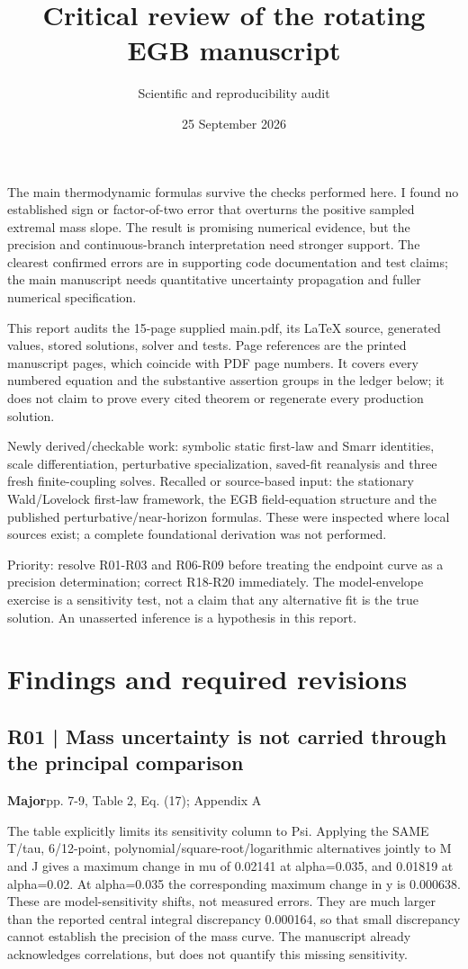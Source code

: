 \documentclass[10pt,a4paper]{article}
\title{Critical review of the rotating EGB manuscript}\author{Scientific and reproducibility audit}\date{25 September 2026}
\begin{document}
\maketitle

The main thermodynamic formulas survive the checks performed here. I found no established sign or factor-of-two error that overturns the positive sampled extremal mass slope. The result is promising numerical evidence, but the precision and continuous-branch interpretation need stronger support. The clearest confirmed errors are in supporting code documentation and test claims; the main manuscript needs quantitative uncertainty propagation and fuller numerical specification.


This report audits the 15-page supplied main.pdf, its LaTeX source, generated values, stored solutions, solver and tests. Page references are the printed manuscript pages, which coincide with PDF page numbers. It covers every numbered equation and the substantive assertion groups in the ledger below; it does not claim to prove every cited theorem or regenerate every production solution.


Newly derived/checkable work: symbolic static first-law and Smarr identities, scale differentiation, perturbative specialization, saved-fit reanalysis and three fresh finite-coupling solves. Recalled or source-based input: the stationary Wald/Lovelock first-law framework, the EGB field-equation structure and the published perturbative/near-horizon formulas. These were inspected where local sources exist; a complete foundational derivation was not performed.


Priority: resolve R01-R03 and R06-R09 before treating the endpoint curve as a precision determination; correct R18-R20 immediately. The model-envelope exercise is a sensitivity test, not a claim that any alternative fit is the true solution. An unasserted inference is a hypothesis in this report.


\section{Findings and required revisions}
\subsection*{R01 | Mass uncertainty is not carried through the principal comparison}
\textbf{Major}\quad pp. 7-9, Table 2, Eq. (17); Appendix A

The table explicitly limits its sensitivity column to Psi. Applying the SAME T/tau, 6/12-point, polynomial/square-root/logarithmic alternatives jointly to M and J gives a maximum change in mu of 0.02141 at alpha=0.035, and 0.01819 at alpha=0.02. At alpha=0.035 the corresponding maximum change in y is 0.000638. These are model-sensitivity shifts, not measured errors. They are much larger than the reported central integral discrepancy 0.000164, so that small discrepancy cannot establish the precision of the mass curve. The manuscript already acknowledges correlations, but does not quantify this missing sensitivity.
\end{document}
